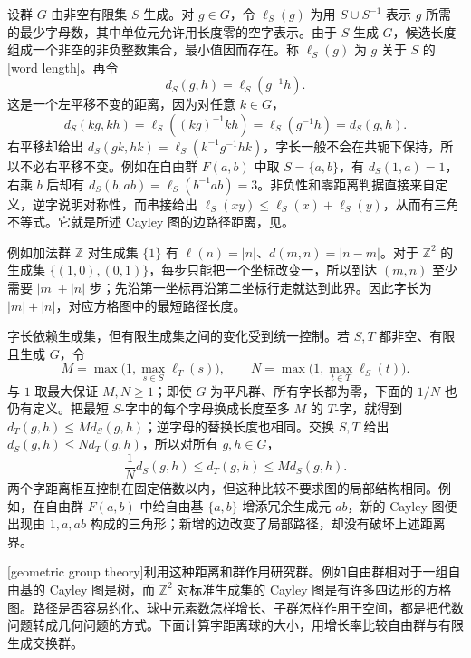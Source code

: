 设群 \(G\) 由非空有限集 \(S\) 生成。对 \(g\in G\)，令 \(\ell_S(g)\) 为用 \(S\cup S^{-1}\) 表示 \(g\) 所需的最少字母数，其中单位元允许用长度零的空字表示。由于 \(S\) 生成 \(G\)，候选长度组成一个非空的非负整数集合，最小值因而存在。称 \(\ell_S(g)\) 为 \(g\) 关于 \(S\) 的[word length]。再令
\[
	d_S(g,h)=\ell_S(g^{-1}h).
\]
这是一个左平移不变的距离，因为对任意 \(k\in G\)，
\[
	d_S(kg,kh)=\ell_S((kg)^{-1}kh)=\ell_S(g^{-1}h)=d_S(g,h).
\]
右平移却给出 \(d_S(gk,hk)=\ell_S(k^{-1}g^{-1}hk)\)，字长一般不会在共轭下保持，所以不必右平移不变。例如在自由群 \(F(a,b)\) 中取 \(S=\{a,b\}\)，有 \(d_S(1,a)=1\)，右乘 \(b\) 后却有 \(d_S(b,ab)=\ell_S(b^{-1}ab)=3\)。非负性和零距离判据直接来自定义，逆字说明对称性，而串接给出 \(\ell_S(xy)\leq\ell_S(x)+\ell_S(y)\)，从而有三角不等式。它就是所述 Cayley 图的边路径距离，见。

\ProseParagraphBreak
例如加法群 \(\mathbb Z\) 对生成集 \(\{1\}\) 有 \(\ell(n)=|n|\)、\(d(m,n)=|n-m|\)。对于 \(\mathbb Z^2\) 的生成集 \(\{(1,0),(0,1)\}\)，每步只能把一个坐标改变一，所以到达 \((m,n)\) 至少需要 \(|m|+|n|\) 步；先沿第一坐标再沿第二坐标行走就达到此界。因此字长为 \(|m|+|n|\)，对应方格图中的最短路径长度。

\ProseParagraphBreak
字长依赖生成集，但有限生成集之间的变化受到统一控制。若 \(S,T\) 都非空、有限且生成 \(G\)，令
\[
	M=\max\bigl(1,\max_{s\in S}\ell_T(s)\bigr),\qquad N=\max\bigl(1,\max_{t\in T}\ell_S(t)\bigr).
\]
与 \(1\) 取最大保证 \(M,N\geq1\)；即使 \(G\) 为平凡群、所有字长都为零，下面的 \(1/N\) 也仍有定义。把最短 \(S\)-字中的每个字母换成长度至多 \(M\) 的 \(T\)-字，就得到 \(d_T(g,h)\leq M d_S(g,h)\)；逆字母的替换长度也相同。交换 \(S,T\) 给出 \(d_S(g,h)\leq N d_T(g,h)\)，所以对所有 \(g,h\in G\)，
\begin{equation}\label{b1:eq:word-metric-generators}
	\dfrac{1}{N}d_S(g,h)\leq d_T(g,h)\leq M d_S(g,h).
\end{equation}
两个字距离相互控制在固定倍数以内，但这种比较不要求图的局部结构相同。例如，在自由群 \(F(a,b)\) 中给自由基 \(\{a,b\}\) 增添冗余生成元 \(ab\)，新的 Cayley 图便出现由 \(1,a,ab\) 构成的三角形；新增的边改变了局部路径，却没有破坏上述距离界。

\ProseParagraphBreak
{}[geometric group theory]利用这种距离和群作用研究群。例如自由群相对于一组自由基的 Cayley 图是树，而 \(\mathbb Z^2\) 对标准生成集的 Cayley 图是有许多四边形的方格图。路径是否容易约化、球中元素数怎样增长、子群怎样作用于空间，都是把代数问题转成几何问题的方式。下面计算字距离球的大小，用增长率比较自由群与有限生成交换群。

